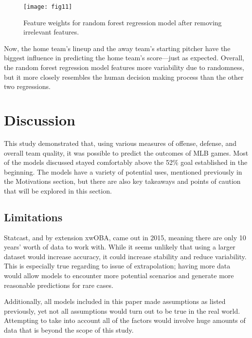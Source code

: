 \documentclass{paper}
\begin{document}
\begin{figure}[H]
  \centering
  \texttt{[image: fig11]}
  \caption{Feature weights for random forest regression model after removing irrelevant features.}
\end{figure}

Now, the home team's lineup and the away team's starting pitcher have the biggest influence in predicting the home team's score---just as expected. Overall, the random forest regression model features more variability due to randomness, but it more closely resembles the human decision making process than the other two regressions.

\section{Discussion}
This study demonstrated that, using various measures of offense, defense, and overall team quality, it was possible to predict the outcomes of MLB games. Most of the models discussed stayed comfortably above the 52\% goal established in the beginning. The models have a variety of potential uses, mentioned previously in the Motivations section, but there are also key takeaways and points of caution that will be explored in this section.

\subsection{Limitations}
Statcast, and by extension xwOBA, came out in 2015, meaning there are only 10 years' worth of data to work with. While it seems unlikely that using a larger dataset would increase accuracy, it could increase stability and reduce variability. This is especially true regarding to issue of extrapolation; having more data would allow models to encounter more potential scenarios and generate more reasonable predictions for rare cases.

Additionally, all models included in this paper made assumptions as listed previously, yet not all assumptions would turn out to be true in the real world. Attempting to take into account all of the factors would involve huge amounts of data that is beyond the scope of this study.
\end{document}
